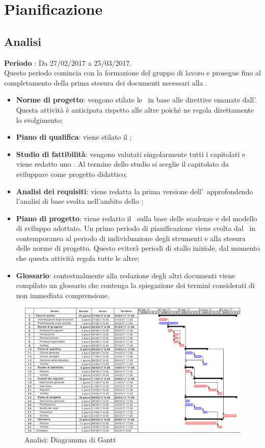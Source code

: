 \documentclass[../PianoDiProgetto.tex]{subfiles}
\begin{document}
	\section{Pianificazione}
	
		\subsection{Analisi}
		\textbf{Periodo} : Da 27/02/2017 a 25/03/2017. \\
		Questo periodo comincia con la formazione del gruppo di lavoro e prosegue fino al completamento della prima stesura dei documenti necessari alla \revisionedeirequisiti.
		\begin{itemize}
			\item \textbf{Norme di progetto}: vengono stilate le \normediprogetto\ in base alle direttive emanate dall'\amministratore. Questa attività è anticipata rispetto alle altre poiché ne regola direttamente lo svolgimento;
			\item \textbf{Piano di qualifica}: viene stilato il  \pianodiqualifica ;
			\item \textbf{Studio di fattibilità}: vengono valutati singolarmente tutti i capitolati e viene redatto uno \studiodifattibilita. Al termine dello studio si sceglie il capitolato da sviluppare come progetto didattico;
			\item \textbf{Analisi dei requisiti}: viene redatta la prima versione dell'\analisideirequisiti\ approfondendo l'analisi di base svolta nell'ambito dello \studiodifattibilita ;
			\item \textbf{Piano di progetto}: viene redatto il \pianodiprogetto\ sulla base delle scadenze e del modello di sviluppo adottato. Un primo periodo di pianificazione viene svolta dal \responsabilediprogetto\ in contemporanea al periodo di individuazione degli strumenti e alla stesura delle norme di progetto. Questo eviterà periodi di stallo iniziale, dal momento che questa attività regola tutte le altre;
			\item \textbf{Glossario}: contestualmente alla redazione degli altri documenti viene compilato un glossario che contenga la spiegazione dei termini considerati di non immediata comprensione.
		\end{itemize}
		\begin{figure}[H]
			\centering
			\includegraphics[scale=0.55]{Figures/Gantt_Analisi.jpg}
			\caption{Analisi: Diagramma di Gantt}
		\end{figure}
			
\end{document}
